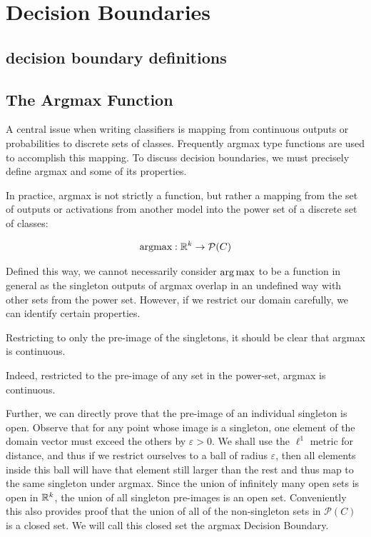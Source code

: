 \chapter{Decision Boundaries}
\label{Chapter4} %

\section{decision boundary definitions} 
\section{The Argmax Function}

A central issue when writing classifiers is mapping from continuous outputs or probabilities to discrete sets of classes. Frequently argmax type functions are used to accomplish this mapping. To discuss decision boundaries, we must precisely define argmax and some of its properties. 

In practice, argmax is not strictly a function, but rather a mapping from the set of outputs or activations from another model into the power set of a discrete set of classes:

\begin{equation}
    \text{argmax} : \mathbb{R}^k \to \mathcal{P}(C)
\end{equation}

Defined this way, we cannot necessarily consider $\operatorname*{arg\,max}$ to be a function in general as the singleton outputs of argmax overlap in an undefined way with other sets from the power set. However, if we restrict our domain carefully, we can identify certain properties. 

Restricting to only the pre-image of the singletons, it should be clear that argmax is continuous. 

Indeed, restricted to the pre-image of any set in the power-set, argmax is continuous. 

Further, we can directly prove that the pre-image of an individual singleton is open. Observe that for any point whose image is a singleton, one element of the domain vector must exceed the others by $\varepsilon > 0$. We shall use the $\ell^1$ metric for distance, and thus if we restrict ourselves to a ball of radius $\varepsilon$, then all elements inside this ball will have that element still larger than the rest and thus map to the same singleton under argmax. Since the union of infinitely many open sets is open in $\mathbb{R}^k$, the union of all singleton pre-images is an open set. Conveniently this also provides proof that the union of all of the non-singleton sets in $\mathcal{P}(C)$ is a closed set. We will call this closed set the argmax Decision Boundary. 

